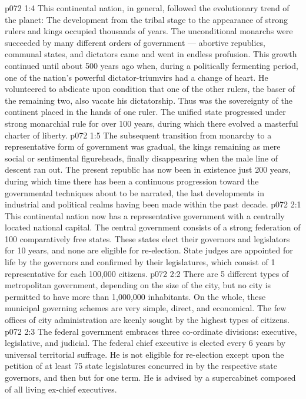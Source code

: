\vs p072 1:4 \pc This continental nation, in general, followed the evolutionary trend of the planet: The development from the tribal stage to the appearance of strong rulers and kings occupied thousands of years. The unconditional monarchs were succeeded by many different orders of government --- abortive republics, communal states, and dictators came and went in endless profusion. This growth continued until about 500 years ago when, during a politically fermenting period, one of the nation’s powerful dictator\hyp{}triumvirs had a change of heart. He volunteered to abdicate upon condition that one of the other rulers, the baser of the remaining two, also vacate his dictatorship. Thus was the sovereignty of the continent placed in the hands of one ruler. The unified state progressed under strong monarchial rule for over 100 years, during which there evolved a masterful charter of liberty.
\vs p072 1:5 The subsequent transition from monarchy to a representative form of government was gradual, the kings remaining as mere social or sentimental figureheads, finally disappearing when the male line of descent ran out. The present republic has now been in existence just 200 years, during which time there has been a continuous progression toward the governmental techniques about to be narrated, the last developments in industrial and political realms having been made within the past decade.
\vs p072 2:1 This continental nation now has a representative government with a centrally located national capital. The central government consists of a strong federation of 100 comparatively free states. These states elect their governors and legislators for 10 years, and none are eligible for re\hyp{}election. State judges are appointed for life by the governors and confirmed by their legislatures, which consist of 1 representative for each 100,000 citizens.
\vs p072 2:2 There are 5 different types of metropolitan government, depending on the size of the city, but no city is permitted to have more than 1,000,000 inhabitants. On the whole, these municipal governing schemes are very simple, direct, and economical. The few offices of city administration are keenly sought by the highest types of citizens.
\vs p072 2:3 The federal government embraces three co\hyp{}ordinate divisions: executive, legislative, and judicial. The federal chief executive is elected every 6 years by universal territorial suffrage. He is not eligible for re\hyp{}election except upon the petition of at least 75 state legislatures concurred in by the respective state governors, and then but for one term. He is advised by a supercabinet composed of all living ex\hyp{}chief executives.

